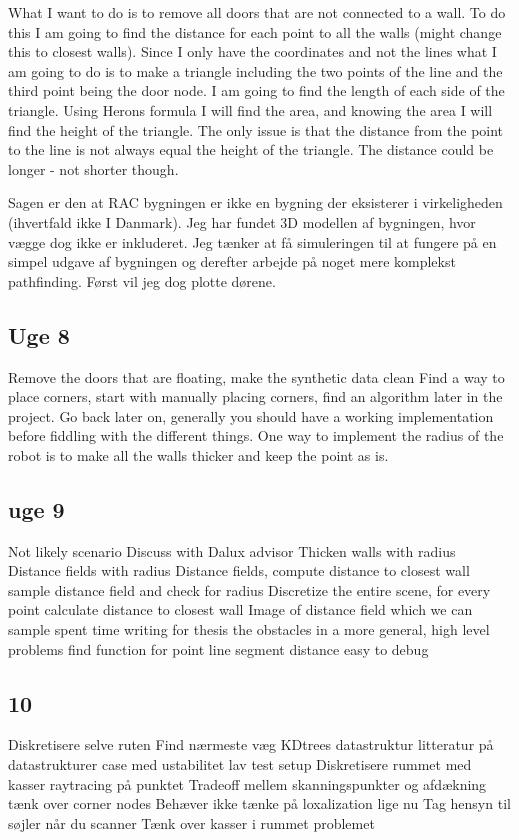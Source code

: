 What I want to do is to remove all doors that are not connected to a wall. To do this I am going to find the distance for each point to all the walls (might change this to closest walls). Since I only have the coordinates and not the lines what I am going to do is to make a triangle including the two points of the line and the third point being the door node. I am going to find the length of each side of the triangle. Using Herons formula I will find the area, and knowing the area I will find the height of the triangle. The only issue is that the distance from the point to the line is not always equal the height of the triangle. The distance could be longer - not shorter though.

Sagen er den at RAC bygningen er ikke en bygning der eksisterer i virkeligheden (ihvertfald ikke I Danmark). Jeg har fundet 3D modellen af bygningen, hvor vægge dog ikke er inkluderet. Jeg tænker at få simuleringen til at fungere på en simpel udgave af bygningen og derefter arbejde på noget mere komplekst pathfinding. Først vil jeg dog plotte dørene.

\subsection{Uge 8}
Remove the doors that are floating, make the synthetic data clean
Find a way to place corners, start with manually placing corners, find an algorithm later in the project.
Go back later on, generally you should have a working implementation before fiddling with the  different things.
One way to implement the radius of the robot is to make all the walls thicker and keep the point as is.

\subsection{uge 9}
Not likely scenario 
Discuss with Dalux advisor 
Thicken walls with radius
Distance fields with radius
Distance fields, compute distance to closest wall
sample distance field and check for radius
Discretize the entire scene, for every point calculate distance to closest wall
Image of distance field which we can sample
spent time writing for thesis the obstacles in a more general, high level problems
find function for point line segment distance 
easy to debug

\subsection{10}
Diskretisere selve ruten
Find nærmeste væg 
KDtrees datastruktur 
litteratur på datastrukturer
case med ustabilitet
lav test setup
Diskretisere rummet med kasser
raytracing på punktet
Tradeoff mellem skanningspunkter og afdækning
tænk over corner nodes
Behæver ikke tænke på loxalization lige nu
Tag hensyn til søjler når du scanner 
Tænk over kasser i rummet problemet

